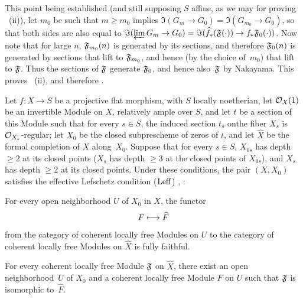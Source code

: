 This point being established (and still supposing $S$ affine, as we may for proving ~(ii)), let $m_0$ be such that $m\geq m_0$ implies $\Im(G_m\to G_0)= \Im(G_{m_0}\to G_0)$, so that both sides are also equal to $\Im(\varprojlim G_m\to G_0) = \Im(\widehat{f}_\ast(\mathfrak F(\cdot))\to f_\ast\mathfrak F_0(\cdot))$. Now note that for large $n$, $\mathfrak F_{m_0}(n)$ is generated by its sections, and therefore $\mathfrak F_0(n)$ is generated by sections that lift to $\mathfrak F_{m_0}$, and hence (by the choice of~$m_0$) that lift to $\mathfrak F$. Thus the sections of $\mathfrak F$ generate $\mathfrak F_0$, and hence also~$\mathfrak F$ by Nakayama. This proves ~(ii), and therefore .

\begin{corollaire} \label{XII.3.4}
Let $f:X\to S$ be a projective flat morphism, with $S$ locally noetherian, let $\mathcal O_X(1)$ be an invertible Module on $X$, relatively ample over $S$, and let $t$ be a section of this Module such that for every $s\in S$, the induced section $t_s$ on\pageoriginale the fiber $X_s$ is $\mathcal O_{X_s}$-regular; let $X_0$ be the closed subprescheme of zeros of $t$, and let $\widehat{X}$ be the formal completion of $X$ along~$X_0$. Suppose that for every $s\in S$, $X_{0s}$ has depth $\geq 2$ at its closed points (\ie $X_s$ has depth $\geq 3$ at the closed points of $X_{0s}$), and $X_s$ has depth $\geq 2$ at its closed points. Under these conditions, the pair $(X, X_0)$ satisfies the effective Lefschetz condition ($\operatorname{Leff}$) , \ie:
\begin{enumeratea}
\item
For every open neighborhood $U$ of $X_0$ in $X$, the functor
\[
F \longmapsto \widehat{F}
\]
from the category of coherent locally free Modules on $U$ to the category of coherent locally free Modules on $\widehat{X}$ is fully faithful.
\item
For every coherent locally free Module $\mathfrak F$ on $\widehat{X}$, there exist an open neighborhood~$U$ of $X_0$ and a coherent locally free Module $F$ on $U$ such that $\mathfrak F$ is isomorphic to~$\widehat{F}$.
\end{enumeratea}
\end{corollaire}

